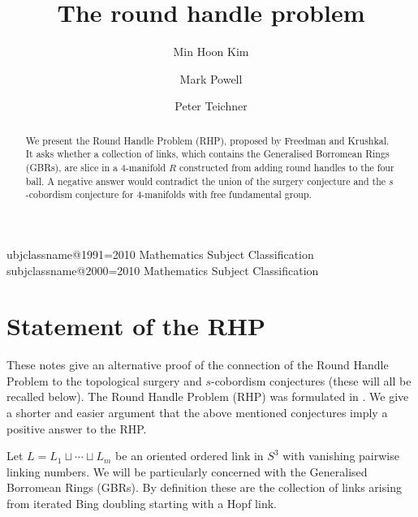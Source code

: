\documentclass[11pt, oneside]{amsart}
\numberwithin{equation}{section}
\theoremstyle{plain}
\theoremstyle{definition}
\theoremstyle{remark}
\numberwithin{equation}{section}
\begin{document}
\title{The round handle problem}

\author{Min Hoon Kim}
\address{School of Mathematics, KIAS, Seoul, Republic of Korea}

\author{Mark Powell}
\address{D\'epartement de Math\'ematiques,
Universit\'e du Qu\'ebec \`a Montr\'eal, Canada}

\author{Peter Teichner}
\address{Max Planck Institut f\"{u}r Mathematik, Vivatsgasse 7, 53111 Bonn, Germany}

\expandafter\let\csname subjclassname@1991\endcsname={\textup{2010} Mathematics Subject Classification}
\expandafter\let\csname subjclassname@2000\endcsname={\textup{2010} Mathematics Subject Classification}

\begin{abstract}
We present the Round Handle Problem (RHP), proposed by Freedman and Krushkal. It asks whether a collection of links, which contains the Generalised Borromean Rings (GBRs), are slice in a $4$-manifold $R$ constructed from adding round handles to the four ball.  A negative answer would contradict the union of the surgery conjecture and the $s$-cobordism conjecture for $4$-manifolds with free fundamental group.
\end{abstract}

\maketitle

\section{Statement of the RHP}

These notes give an alternative proof of the connection of the Round Handle Problem to the topological surgery and $s$-cobordism conjectures (these will all be recalled below).  The Round Handle Problem (RHP) was formulated in \cite[Section~5.1]{Freedman-Krushkal-2016-A}.  We give a shorter and easier argument that the above mentioned conjectures imply a positive answer to the RHP.

Let $L = L_1 \sqcup \cdots \sqcup L_m$ be an oriented ordered link in $S^3$ with vanishing pairwise linking numbers.  We will be particularly concerned with the Generalised Borromean Rings (GBRs). By definition these are the collection of links arising from iterated Bing doubling starting with a Hopf link.
\end{document}
